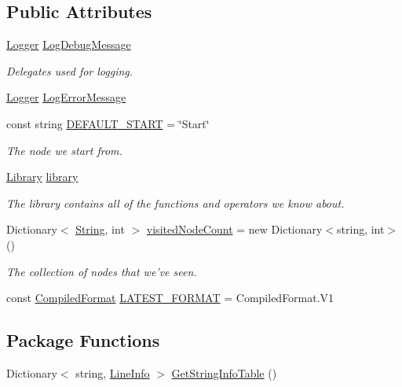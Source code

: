\subsection*{Public Attributes}
\begin{DoxyCompactItemize}
\item 
\hyperlink{a00050_a1e50031b945a3a2afafee6f590730568}{Logger} \hyperlink{a00090_a381f48bb0fbb294f8cf44ca57f11be31}{Log\-Debug\-Message}
\begin{DoxyCompactList}\small\item\em Delegates used for logging. \end{DoxyCompactList}\item 
\hyperlink{a00050_a1e50031b945a3a2afafee6f590730568}{Logger} \hyperlink{a00090_a9801e83dd044d6498fdf6ebcc6bec5ac}{Log\-Error\-Message}
\item 
const string \hyperlink{a00090_a1b643f15f734090e6a58cbf13dafd28f}{D\-E\-F\-A\-U\-L\-T\-\_\-\-S\-T\-A\-R\-T} = \char`\"{}Start\char`\"{}
\begin{DoxyCompactList}\small\item\em The node we start from. \end{DoxyCompactList}\item 
\hyperlink{a00123}{Library} \hyperlink{a00090_ae660d4cfb6e296358d2f61d8ee74c66a}{library}
\begin{DoxyCompactList}\small\item\em The library contains all of the functions and operators we know about. \end{DoxyCompactList}\item 
Dictionary$<$ \hyperlink{a00050_a301aa7c866593a5b625a8fc158bbeacea27118326006d3829667a400ad23d5d98}{String}, int $>$ \hyperlink{a00090_aae9e64354066a1e2fa130629959d772b}{visited\-Node\-Count} = new Dictionary$<$string, int$>$()
\begin{DoxyCompactList}\small\item\em The collection of nodes that we've seen. \end{DoxyCompactList}\item 
const \hyperlink{a00090_a903f18cdcc66c28ceab5a43c41fe074d}{Compiled\-Format} \hyperlink{a00090_a3bc83587462ade6a2f7f42cb7576e50e}{L\-A\-T\-E\-S\-T\-\_\-\-F\-O\-R\-M\-A\-T} = Compiled\-Format.\-V1
\end{DoxyCompactItemize}
\subsection*{Package Functions}
\begin{DoxyCompactItemize}
\item 
Dictionary$<$ string, \hyperlink{a00125}{Line\-Info} $>$ \hyperlink{a00090_a5c5117de678626ebcfb9a6f875e6e53a}{Get\-String\-Info\-Table} ()
\end{DoxyCompactItemize}
